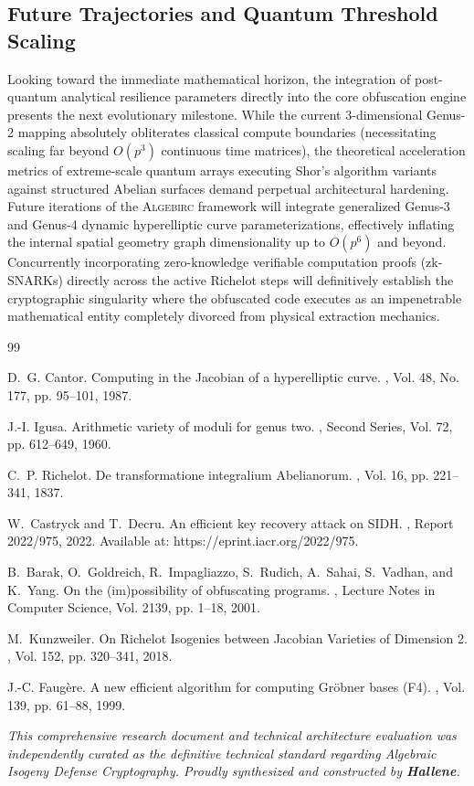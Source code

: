\subsection{Future Trajectories and Quantum Threshold Scaling}
Looking toward the immediate mathematical horizon, the integration of post-quantum analytical resilience parameters directly into the core obfuscation engine presents the next evolutionary milestone. While the current 3-dimensional Genus-2 mapping absolutely obliterates classical compute boundaries (necessitating scaling far beyond $O(p^3)$ continuous time matrices), the theoretical acceleration metrics of extreme-scale quantum arrays executing Shor’s algorithm variants against structured Abelian surfaces demand perpetual architectural hardening. Future iterations of the \textsc{Algebirc} framework will integrate generalized Genus-3 and Genus-4 dynamic hyperelliptic curve parameterizations, effectively inflating the internal spatial geometry graph dimensionality up to $O(p^6)$ and beyond. Concurrently incorporating zero-knowledge verifiable computation proofs (zk-SNARKs) directly across the active Richelot steps will definitively establish the cryptographic singularity where the obfuscated code executes as an impenetrable mathematical entity completely divorced from physical extraction mechanics.

\begin{thebibliography}{99}

D.~G. Cantor.
\newblock Computing in the Jacobian of a hyperelliptic curve.
, Vol. 48, No. 177, pp. 95--101, 1987.

J.-I. Igusa.
\newblock Arithmetic variety of moduli for genus two.
, Second Series, Vol. 72, pp. 612--649, 1960.

C.~P. Richelot.
\newblock De transformatione integralium Abelianorum.
, Vol. 16, pp. 221--341, 1837.

W.~Castryck and T.~Decru.
\newblock An efficient key recovery attack on SIDH.
, Report 2022/975, 2022. Available at: https://eprint.iacr.org/2022/975.

B.~Barak, O.~Goldreich, R.~Impagliazzo, S.~Rudich, A.~Sahai, S.~Vadhan, and K.~Yang.
\newblock On the (im)possibility of obfuscating programs.
, Lecture Notes in Computer Science, Vol. 2139, pp. 1--18, 2001.

M.~Kunzweiler.
\newblock On Richelot Isogenies between Jacobian Varieties of Dimension 2.
, Vol. 152, pp. 320--341, 2018.

J.-C. Faugère.
\newblock A new efficient algorithm for computing Gröbner bases (F4).
, Vol. 139, pp. 61--88, 1999.

\end{thebibliography}

\vfill
\noindent\textit{This comprehensive research document and technical architecture evaluation was independently curated as the definitive technical standard regarding Algebraic Isogeny Defense Cryptography. Proudly synthesized and constructed by \textbf{Hallene}.}
